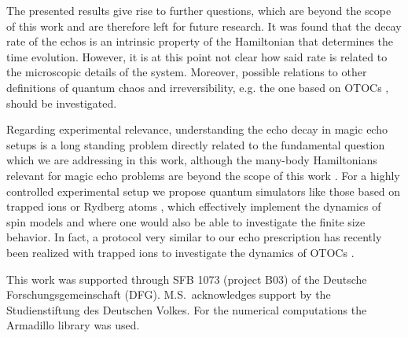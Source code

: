 \documentclass[%
 reprint,
unsortedaddress,
 amsmath,amssymb,
 prl,
]{revtex4-1}
\begin{document}
The presented results give rise to further questions, which are beyond the scope of this work and 
are therefore left for future research.
It was found that the decay rate of the echos is an intrinsic property of the Hamiltonian that
determines the time evolution. However, it is at this point not clear how said rate is related to the
microscopic details of the system. 
Moreover, possible relations to other definitions of quantum chaos and irreversibility,
e.g. the one based on OTOCs \cite{Shenker2014,Kitaev2014}, should be investigated.

Regarding experimental relevance, understanding the echo decay in magic echo setups \cite{Schneider1969,Rhim1971,Hafner1996,Morgan2012} is a long standing problem directly related to the fundamental question which we are addressing in this work, although the many-body Hamiltonians relevant for magic echo problems are beyond the scope of this work \cite{Pastawski2000}. For a highly controlled experimental setup we propose quantum simulators like those based on trapped ions \cite{Monz2011,Blatt2012,Zhang2017,Jurcevic2017} or Rydberg atoms \cite{Bernien2017,Guardado-Sanchez2018}, which effectively implement the dynamics of spin models and where one would also be able to investigate the finite size behavior. 
In fact, a protocol very similar to our echo prescription has recently been realized with trapped ions to investigate the dynamics of OTOCs \cite{Garttner2017}.


\begin{acknowledgments}
This work was supported through SFB 1073 (project B03) of the
Deutsche Forschungsgemeinschaft (DFG).
M.S.\ acknowledges support by the Studienstiftung des Deutschen Volkes.
For the numerical computations the Armadillo library \cite{armadillo} was used.
\end{acknowledgments}

\begin{thebibliography}{0}
%
%
\end{thebibliography}
\end{document}
